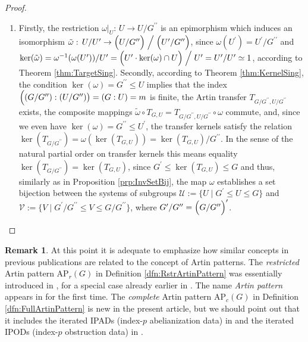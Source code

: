 \documentclass{amsart}
\theoremstyle{definition}
\newtheorem{remark}{Remark}[section]
\numberwithin{equation}{section}
\begin{document}
\begin{proof}
\begin{enumerate}
\item
Firstly, the restriction \(\omega\vert_U:\,U\to U/G^{\prime\prime}\) is an epimorphism
which induces an isomorphism
\(\tilde{\omega}:\,U/U^\prime\to\Bigl(U/G^{\prime\prime}\Bigr)\Bigm/\Bigl(U^\prime/G^{\prime\prime}\Bigr)\),
since \(\omega(U^\prime)=U^\prime/G^{\prime\prime}\) and
\(\ker(\tilde{\omega})=\omega^{-1}(\omega(U^\prime))/U^\prime
=\Bigl(U^\prime\cdot\ker(\omega)\cap U\Bigr)\Bigm/U^\prime=U^\prime/U^\prime\simeq 1\),
according to Theorem
\ref{thm:TargetSing}.
Secondly, according to Theorem
\ref{thm:KernelSing},
the condition \(\ker(\omega)=G^{\prime\prime}\le U\) implies that the index
\(\Bigl((G/G^{\prime\prime}):(U/G^{\prime\prime})\bigr)=(G:U)=m\) is finite,
the Artin transfer \(T_{G/G^{\prime\prime},U/G^{\prime\prime}}\) exists,
the composite mappings
\(\tilde{\omega}\circ T_{G,U}=T_{G/G^{\prime\prime},U/G^{\prime\prime}}\circ\omega\) commute, and,
since we even have \(\ker(\omega)=G^{\prime\prime}\le U^\prime\),
the transfer kernels satisfy the relation
\(\ker(T_{G/G^{\prime\prime}})=\omega(\ker(T_{G,U}))=\ker(T_{G,U})/G^{\prime\prime}\).
In the sense of the natural partial order on transfer kernels this means equality
\(\ker(T_{G/G^{\prime\prime}})=\ker(T_{G,U})\),
since \(G^\prime\le\ker(T_{G,U})\le G\) and thus,
similarly as in Proposition
\ref{prp:InvSetBij},
the map \(\omega\) establishes a set bijection between the
systems of subgroups \(\mathcal{U}:=\lbrace U\mid G^\prime\le U\le G\rbrace\)
and \(\mathcal{V}:=\lbrace V\mid G^\prime/G^{\prime\prime}\le V\le G/G^{\prime\prime}\rbrace\),
where \(G^\prime/G^{\prime\prime}=\Bigl(G/G^{\prime\prime}\Bigr)^{\prime}\).
\end{enumerate}
\end{proof}



\begin{remark}
\label{rmk:DrvSer}
At this point it is adequate to emphasize
how similar concepts in previous publications
are related to the concept of Artin patterns.
The \textit{restricted} Artin pattern \(\mathrm{AP}_r(G)\) in Definition
\ref{dfn:RstrArtinPattern}
was essentially introduced in
\cite[Dfn.1.1, p.403]{Ma4},
for a special case already earlier in
\cite[\S\ 1, p.417]{Ma3}.
The name \textit{Artin pattern} appears in
\cite[Dfn.3.1, p.747]{Ma7}
for the first time.
The \textit{complete} Artin pattern \(\mathrm{AP}_c(G)\) in Definition
\ref{dfn:FullArtinPattern}
is new in the present article,
but we should point out that it includes the
iterated IPADs (index-\(p\) abelianization data) in
\cite[Dfn.3.5, p.289]{Ma6}
and the iterated IPODs (index-\(p\) obstruction data) in
\cite[Dfn.4.5]{Ma8}.
\end{remark}
\end{document}

